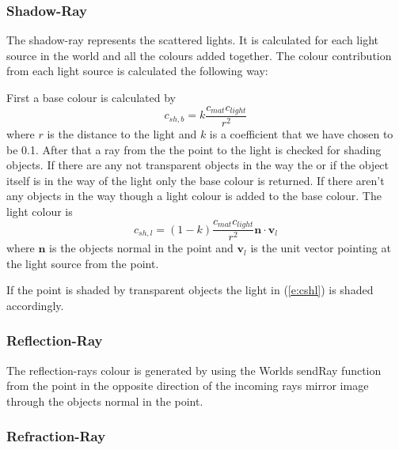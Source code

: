 		\subsubsection{Shadow-Ray}
			
			The shadow-ray represents the scattered lights. It is calculated for each light source in the world and all the colours added together. The colour contribution from each light source is calculated the following way:
			
			First a base colour is calculated by
			\begin{equation}
				c_{sh,b} = k\frac{c_{mat}c_{light}}{r^2}
			\end{equation}
			where $r$ is the distance to the light and $k$ is a coefficient that we have chosen to be 0.1. After that a ray from the the point to the light is checked for shading objects. If there are any not transparent objects in the way the or if the object itself is in the way of the light only the base colour is returned. If there aren't any objects in the way though a light colour is added to the base colour. The light colour is 
			\begin{equation}\label{e:cshl}
				c_{sh,l} = (1-k)\frac{c_{mat}c_{light}}{r^2}\mathbf{n}\cdot\mathbf{v}_l
			\end{equation}
			where $\mathbf{n}$ is the objects normal in the point and $\mathbf{v}_l$ is the unit vector pointing at the light source from the point.

			If the point is shaded by transparent objects the light in (\ref{e:cshl}) is shaded accordingly.
			
		\subsubsection{Reflection-Ray}
		
			The reflection-rays colour is generated by using the Worlds sendRay function from the point in the opposite direction of the incoming rays mirror image through the objects normal in the point.
		
		\subsubsection{Refraction-Ray}
		
